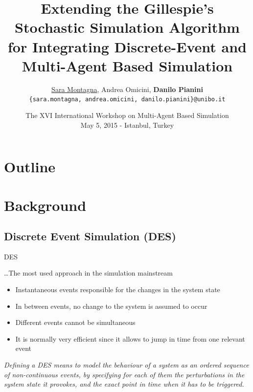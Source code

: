 \documentclass[presentation]{beamer} %
\title[Gillespie's SSA to Integrate DES and MABS]{Extending the Gillespie's Stochastic Simulation Algorithm for Integrating Discrete-Event and Multi-Agent Based Simulation}
\author[Montagna, Omicini, Pianini]{
\underline{Sara Montagna}, Andrea Omicini, \textbf{Danilo Pianini}\\
\texttt{{\footnotesize \{sara.montagna, andrea.omicini, danilo.pianini\}@unibo.it}}}
\institute[UNIBO]
{\textsc{Alma Mater Studiorum}---Universit\`a di Bologna a Cesena}
\date[2015-05-15 MABS]{The XVI International Workshop on Multi-Agent Based Simulation\\
\scriptsize May 5, 2015 - Istanbul, Turkey
}
\begin{document}
\frame[label=coverpage]{\titlepage}

\section*{Outline}
\frame{\tableofcontents}



\section{Background}

\subsection{Discrete Event Simulation (DES)}


\begin{frame}{DES}

\ldots The most used approach in the simulation mainstream
\begin{block}{}
	\begin{itemize}
    		\item Instantaneous events responsible for the changes in the system state
    		\item In between events, no change to the system is assumed to occur
    		\item Different events cannot be simultaneous
		\item It is normally very efficient since it allows to jump in time from one relevant event
	\end{itemize}
\end{block}

		
\emph{Defining a DES means to model the behaviour of a system as an ordered sequence of non-continuous events, by specifying for each of them the \emph{perturbations} in the system state it provokes, and the exact point in time when it has to be triggered. }

\end{frame}
\end{document}
